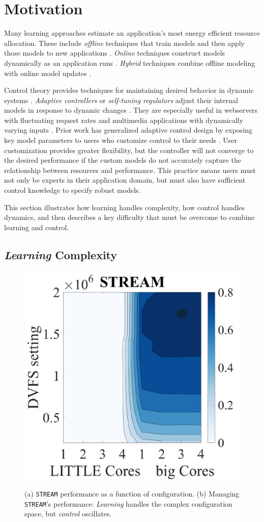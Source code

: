 \section{Motivation}
\label{sec:example}
Many learning approaches estimate an application's most energy
efficient resource allocation.  These include \emph{offline}
techniques that train models and then apply those models to new
applications
\cite{Yi2003,LeeBrooks2006,CPR,reddiHPCA2013,PUPiL,quasar}.
\emph{Online} techniques construct models dynamically as an
application runs
\cite{Li2006,Flicker,ParallelismDial,Ponamarev,LeeBrooks}.
\emph{Hybrid} techniques combine offline modeling with online model
updates \cite{packandcap,Winter2010,dubach2010,Koala,Cinder,
  wu2012inferred,LEO}.

Control theory provides techniques for maintaining desired behavior in
dynamic systems \cite{Hellerstein2004a}. \emph{Adaptive controllers}
or \emph{self-tuning regulators} adjust their internal models in
response to dynamic changes \cite{HandbookControl}. They are
especially useful in webservers with fluctuating request rates
\cite{Horvarth,LuEtAl-2006a,SunDaiPan-2008a} and multimedia
applications with dynamically varying inputs
\cite{TCST,Agilos,grace2}.  Prior work has generalized adaptive
control design by exposing key model parameters to users who customize
control to their needs \cite{ControlWare,POET}.  User customization
provides greater flexibility, but the controller will not converge to
the desired performance if the custom models do not accurately capture
the relationship between resources and performance.  This practice
means users must not only be experts in their application domain, but
must also have sufficient control knowledge to specify robust models.

This section illustrates how learning handles complexity, how control
handles dynamics, and then describes a key difficulty that must be
overcome to combine learning and control.

\subsection{\emph{Learning} Complexity}
\begin{figure}
\centering
    \includegraphics[width=.37 \textwidth]{figures/STREAM-contour.pdf}
    \label{fig:STREAM_contour}
    
    \label{fig:STREAM_timeline}
  \caption{(a) \texttt{STREAM} performance as a function of
    configuration.  (b) Managing \texttt{STREAM}'s performance:
    \emph{Learning} handles the complex configuration space, but
    \emph{control} oscillates.}
  \label{fig:learning-models1}
\end{figure}

